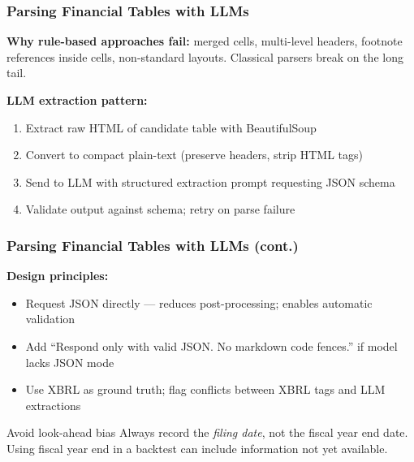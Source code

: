 \documentclass[9pt,t]{beamer}
\begin{document}
\begin{frame}
\frametitle{Parsing Financial Tables with LLMs}

\textbf{Why rule-based approaches fail:} merged cells, multi-level headers, footnote references
inside cells, non-standard layouts. Classical parsers break on the long tail.

\medskip
\begin{underhood}
\textbf{LLM extraction pattern:}
\begin{enumerate}
  \item Extract raw HTML of candidate table with BeautifulSoup
  \item Convert to compact plain-text (preserve headers, strip HTML tags)
  \item Send to LLM with structured extraction prompt requesting JSON schema
  \item Validate output against schema; retry on parse failure
\end{enumerate}
\end{underhood}
\end{frame}

\begin{frame}
\frametitle{Parsing Financial Tables with LLMs (cont.)}

\textbf{Design principles:}
\begin{itemize}
  \item Request JSON directly --- reduces post-processing; enables automatic validation
  \item Add ``Respond only with valid JSON. No markdown code fences.'' if model lacks JSON mode
  \item Use XBRL as ground truth; flag conflicts between XBRL tags and LLM extractions
\end{itemize}

\medskip
\begin{alertblock}{Avoid look-ahead bias}
Always record the \emph{filing date}, not the fiscal year end date.
Using fiscal year end in a backtest can include information not yet available.
\end{alertblock}
\end{frame}

\end{document}
